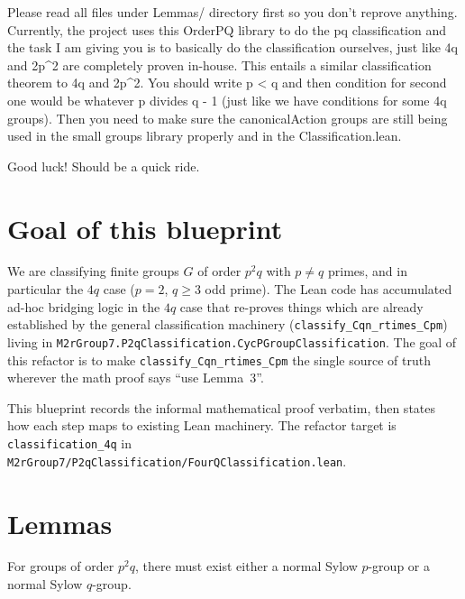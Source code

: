 Please read all files under Lemmas/ directory first so you don't reprove anything. Currently, the project uses this OrderPQ library to do the pq classification and the task I am giving you is to basically do the classification ourselves, just like 4q and 2p^2 are completely proven in-house. This entails a similar classification theorem to 4q and 2p^2. You should write p < q and then condition for second one would be whatever p divides q - 1 (just like we have conditions for some 4q groups). Then you need to make sure the canonicalAction groups are still being used in the small groups library properly and in the Classification.lean.

Good luck! Should be a quick ride.




\section{Goal of this blueprint}

We are classifying finite groups $G$ of order $p^2 q$ with $p \neq q$ primes,
and in particular the $4q$ case ($p = 2$, $q \geq 3$ odd prime). The Lean code
has accumulated ad-hoc bridging logic in the $4q$ case that re-proves things
which are already established by the general classification machinery
(\texttt{classify\_Cqn\_rtimes\_Cpm}) living in
\texttt{M2rGroup7.P2qClassification.CycPGroupClassification}. The goal of this
refactor is to make \texttt{classify\_Cqn\_rtimes\_Cpm} the single source of
truth wherever the math proof says ``use Lemma~3''.

This blueprint records the informal mathematical proof verbatim, then states
how each step maps to existing Lean machinery. The refactor target is
\texttt{classification\_4q} in
\texttt{M2rGroup7/P2qClassification/FourQClassification.lean}.

\section{Lemmas}

\begin{lemma}
    \label{lem:p2q-normal-sylow}
    For groups of order $p^2 q$, there must exist either a normal Sylow
    $p$-group or a normal Sylow $q$-group.
\end{lemma}

